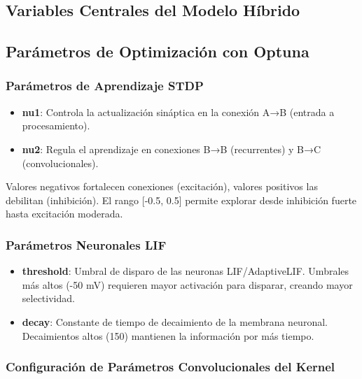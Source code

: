 \subsection{Variables Centrales del Modelo Híbrido}

\subsection{Parámetros de Optimización con Optuna}

\subsubsection*{Parámetros de Aprendizaje STDP}

\begin{itemize}
    \item \textbf{nu1}: Controla la actualización sináptica en la conexión A→B (entrada a procesamiento).
    \item \textbf{nu2}: Regula el aprendizaje en conexiones B→B (recurrentes) y B→C (convolucionales).
\end{itemize}

 Valores negativos fortalecen conexiones (excitación), valores positivos las debilitan (inhibición). El rango [-0.5, 0.5] permite explorar desde inhibición fuerte hasta excitación moderada.

\subsubsection*{Parámetros Neuronales LIF}

\begin{itemize}
    \item \textbf{threshold}:  Umbral de disparo de las neuronas LIF/AdaptiveLIF. Umbrales más altos (-50 mV) requieren mayor activación para disparar, creando mayor selectividad.
    \item \textbf{decay}: Constante de tiempo de decaimiento de la membrana neuronal. Decaimientos altos (150) mantienen la información por más tiempo.
\end{itemize}


\subsubsection{Configuración de Parámetros Convolucionales del Kernel}


